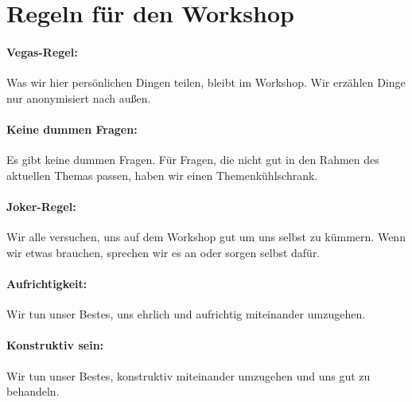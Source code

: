 \section{Regeln für den Workshop}
\label{gfk-workshopregeln}

\paragraph{Vegas-Regel:} Was wir hier persönlichen Dingen teilen, bleibt im Workshop. Wir erzählen Dinge nur anonymisiert nach außen.

\paragraph{Keine dummen Fragen:} Es gibt keine dummen Fragen. Für Fragen, die nicht gut in den Rahmen des aktuellen Themas passen, haben wir einen Themenkühlschrank.

\paragraph{Joker-Regel:} Wir alle versuchen, uns auf dem Workshop gut um uns selbst zu kümmern. Wenn wir etwas brauchen, sprechen wir es an oder sorgen selbst dafür.

\paragraph{Aufrichtigkeit:} Wir tun unser Bestes, uns ehrlich und aufrichtig miteinander umzugehen.

\paragraph{Konstruktiv sein:} Wir tun unser Bestes, konstruktiv miteinander umzugehen und uns gut zu behandeln.

